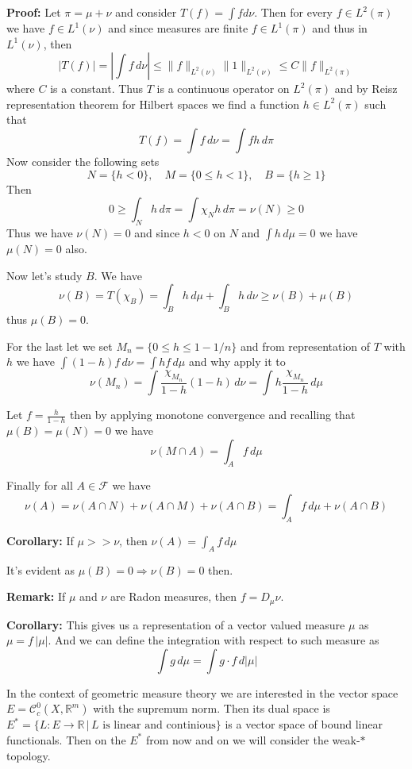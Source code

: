 \documentclass{article}
\begin{document}
\vspace{1ex}
\textbf{Proof:} Let $\pi=\mu+\nu$ and consider $T(f)=\int fd\nu$. Then for
every $f\in L^2(\pi)$ we have $f\in L^1(\nu)$ and since measures are finite
$f\in L^1(\pi)$ and thus in $L^1(\nu)$, then
\[|T(f)|=|\int f\,d\nu|\leq\|f\|_{L^2(\nu)}\|1\|_{L^2(\nu)}\leq C\|f\|_{L^2(\pi)}\]
where $C$ is a constant. Thus $T$ is a continuous operator on $L^2(\pi)$ and by
Reisz representation theorem for Hilbert spaces we find a function $h\in L^2(\pi)$
such that
\[T(f)=\int f\,d\nu=\int fh\,d\pi\]
Now consider the following sets
\[N=\{h<0\},\quad M=\{0\leq h<1\},\quad B=\{h\geq 1\}\]
Then
\[0\geq\int_N h\,d\pi=\int\chi_N h\,d\pi=\nu(N)\geq 0\]
Thus we have $\nu(N)=0$ and since $h<0$ on $N$ and $\int h\,d\mu=0$ we have
$\mu(N)=0$ also.

\vspace{1ex}
Now let's study $B$. We have
\[\nu(B)=T(\chi_B)=\int_Bh\,d\mu+\int_B h\,d\nu\geq\nu(B)+\mu(B)\]
thus $\mu(B)=0$.

For the last let we set $M_n=\{0\leq h\leq1-1/n\}$ and from representation of
$T$ with $h$ we have $\int(1-h)f\,d\nu=\int hf\,d\mu$ and why apply it to
\[\nu(M_n)=\int\frac{\chi_{M_n}}{1-h}(1-h)\,d\nu=\int h\frac{\chi_{M_n}}{1-h}\,d\mu\]

Let $f=\frac{h}{1-h}$ then by applying monotone convergence and recalling that
$\mu(B)=\mu(N)=0$ we have
\[\nu(M\cap A)=\int_A f\,d\mu\]

Finally for all $A\in\mathcal F$ we have
\[\nu(A)=\nu(A\cap N)+\nu(A\cap M)+\nu(A\cap B) = \int_A f\,d\mu+\nu(A\cap B)\]

\vspace{2ex}
\textbf{Corollary:} If $\mu >> \nu$, then $\nu(A)=\int_A f\,d\mu$

\vspace{1ex}
It's evident as $\mu(B)=0\Rightarrow\nu(B)=0$ then. 

\vspace{2ex}
\textbf{Remark:} If $\mu$ and $\nu$ are Radon measures, then $f=D_\mu\nu$.

\vspace{2ex}
\textbf{Corollary:}
This gives us a representation of a vector valued measure $\mu$ as $\mu=f\,|\mu|$.
And we can define the integration with respect to such measure as
\[
\int g\,d\mu = \int g\cdot f\,d|\mu|
\]

\vspace{2ex}
In the context of geometric measure theory we are interested in the vector
space $E=\mathcal{C}^0_c(X, \mathbb{R}^m)$ with the supremum norm.
Then its dual space is $E^*=\{L:E\rightarrow\mathbb{R}\,|\,L\text{ is linear
and continious}\}$ is a vector space of bound linear functionals. Then on the $E^*$ from 
now and on we will consider the weak-$*$ topology.
\end{document}

